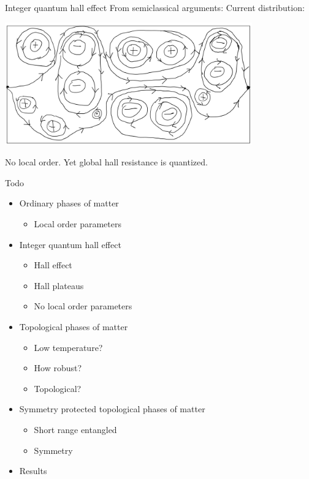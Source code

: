 \documentclass{beamer}
\begin{document}
\begin{frame}{Integer quantum hall effect}
	From semiclassical arguments: Current distribution:
	\begin{center}
		\includegraphics[width=0.8\textwidth]{Images/HallEffectSemiclassicalCurrents.png}
	\end{center}
	\pause
	No local order. Yet global hall resistance is quantized.
\end{frame}

\begin{frame}{Todo}
	\begin{itemize}
		\item[\done] Ordinary phases of matter
		\begin{itemize}
			\item[\done] Local order parameters
		\end{itemize}
		\item[\done] Integer quantum hall effect
		\begin{itemize}
			\item[\done] Hall effect
			\item[\done] Hall plateaus
			\item[\done] No local order parameters
		\end{itemize}
		\item[\todo] Topological phases of matter
		\begin{itemize}
			\item[\todo] Low temperature?
			\item[\todo] How robust?
			\item[\todo] Topological?
		\end{itemize}
		\item[\todo] Symmetry protected topological phases of matter
		\begin{itemize}
			\item[\todo] Short range entangled
			\item[\todo] Symmetry
		\end{itemize}
		\item[\todo] Results
	\end{itemize}
\end{frame}
\end{document}
